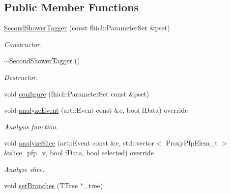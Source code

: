 \subsection*{Public Member Functions}
\begin{DoxyCompactItemize}
\item 
\hyperlink{classanalysis_1_1SecondShowerTagger_aa121025a696b255adb0083d8d7663452}{Second\+Shower\+Tagger} (const fhicl\+::\+Parameter\+Set \&pset)
\begin{DoxyCompactList}\small\item\em Constructor. \end{DoxyCompactList}\item 
\hyperlink{classanalysis_1_1SecondShowerTagger_aac1de8ff2a94eb16002fe31e443142fe}{$\sim$\+Second\+Shower\+Tagger} ()\hypertarget{classanalysis_1_1SecondShowerTagger_aac1de8ff2a94eb16002fe31e443142fe}{}\label{classanalysis_1_1SecondShowerTagger_aac1de8ff2a94eb16002fe31e443142fe}

\begin{DoxyCompactList}\small\item\em Destructor. \end{DoxyCompactList}\item 
void \hyperlink{classanalysis_1_1SecondShowerTagger_a28b2473b914dc1becd997bac1b17cb9e}{configure} (fhicl\+::\+Parameter\+Set const \&pset)
\item 
void \hyperlink{classanalysis_1_1SecondShowerTagger_a5382cf58b77e81846e13c09a473917c0}{analyze\+Event} (art\+::\+Event const \&e, bool f\+Data) override\hypertarget{classanalysis_1_1SecondShowerTagger_a5382cf58b77e81846e13c09a473917c0}{}\label{classanalysis_1_1SecondShowerTagger_a5382cf58b77e81846e13c09a473917c0}

\begin{DoxyCompactList}\small\item\em Analysis function. \end{DoxyCompactList}\item 
void \hyperlink{classanalysis_1_1SecondShowerTagger_a46e6a32a45ca1de533d8c54ac4a7096a}{analyze\+Slice} (art\+::\+Event const \&e, std\+::vector$<$ Proxy\+Pfp\+Elem\+\_\+t $>$ \&slice\+\_\+pfp\+\_\+v, bool f\+Data, bool selected) override
\begin{DoxyCompactList}\small\item\em Analyze slice. \end{DoxyCompactList}\item 
void \hyperlink{classanalysis_1_1SecondShowerTagger_a3a32f909db8afce67dd3a5a417f2e066}{set\+Branches} (T\+Tree $\ast$\+\_\+tree)\hypertarget{classanalysis_1_1SecondShowerTagger_a3a32f909db8afce67dd3a5a417f2e066}{}\label{classanalysis_1_1SecondShowerTagger_a3a32f909db8afce67dd3a5a417f2e066}


\end{DoxyCompactItemize}
